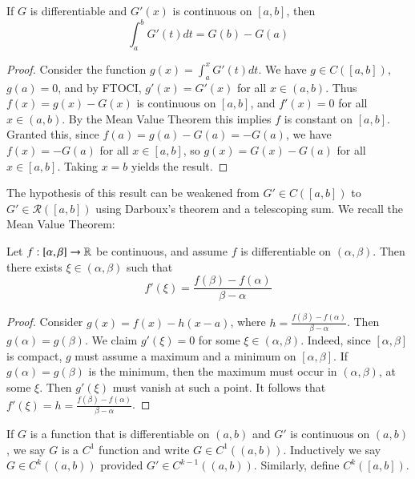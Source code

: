 \begin{theorem}
    If $G$ is differentiable and $G'(x)$ is continuous on $[a,b]$, then $$\int_a^bG'(t)dt = G(b) - G(a)$$
\end{theorem}
\begin{proof}
    Consider the function $g(x) = \int_a^xG'(t)dt$. We have $g \in C([a,b])$, $g(a) = 0$, and by FTOCI, $g'(x) = G'(x)$ for all $x \in (a,b)$. Thus $f(x) = g(x)-G(x)$ is continuous on $[a,b]$, and $f'(x) = 0$ for all $x \in (a,b)$. By the Mean Value Theorem this implies $f$ is constant on $[a,b]$. Granted this, since $f(a) = g(a)-G(a)= -G(a)$, we have $f(x) = -G(a)$ for all $x \in [a,b]$, so $g(x) = G(x) - G(a)$ for all $x \in [a,b]$. Taking $x = b$ yields the result.
\end{proof}

The hypothesis of this result can be weakened from $G' \in C([a,b])$ to $G' \in \mathcal{R}([a,b])$ using Darboux's theorem and a telescoping sum. We recall the Mean Value Theorem:

\begin{theorem}
    Let $f:[\alpha,\beta]\rightarrow \mathbb R$ be continuous, and assume $f$ is differentiable on $(\alpha,\beta)$. Then there exists $\xi \in (\alpha, \beta)$ such that $$f'(\xi) = \frac{f(\beta) - f(\alpha)}{\beta - \alpha}$$
\end{theorem}
\begin{proof}
    Consider $g(x) = f(x) - h(x-a)$, where $h = \frac{f(\beta) - f(\alpha)}{\beta - \alpha}$. Then $g(\alpha) = g(\beta)$. We claim $g'(\xi) = 0$ for some $\xi \in (\alpha,\beta)$. Indeed, since $[\alpha,\beta]$ is compact, $g$ must assume a maximum and a minimum on $[\alpha,\beta]$. If $g(\alpha) = g(\beta)$ is the minimum, then the maximum must occur in $(\alpha,\beta)$, at some $\xi$. Then $g'(\xi)$ must vanish at such a point. It follows that $f'(\xi) = h = \frac{f(\beta) - f(\alpha)}{\beta-\alpha}$.
\end{proof}


\begin{note}
    If $G$ is a function that is differentiable on $(a,b)$ and $G'$ is continuous on $(a,b)$, we say $G$ is a $C^1$ function and write $G \in C^1((a,b))$. Inductively we say $G \in C^k((a,b))$ provided $G' \in C^{k-1}((a,b))$. Similarly, define $C^k([a,b])$.
\end{note}


